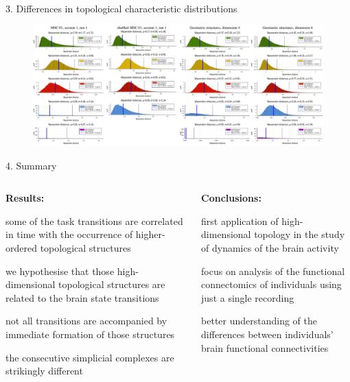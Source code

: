 \documentclass[final]{beamer}
\begin{document}
\begin{frame}{}
    \begin{block}{3. Differences in topological characteristic distributions}
    \begin{figure}[H]
        \centering
          \includegraphics[width=0.8\linewidth]{images/distributions.pdf}
        \label{fig:distros}
    \end{figure}
    \end{block}
    
    \begin{block}{4. Summary}
    \begin{columns}
            \begin{column}{0.48\textwidth}
            
                \textbf{Results:}
                \begin{itemize}
                \small{
                    \item some of the task transitions are correlated in time with the occurrence of higher-ordered topological structures
                    \item we hypothesise that those high-dimensional topological structures are related to the brain state transitions
                    \item  not all transitions are accompanied by immediate formation of those structures 
                    \item the consecutive simplicial complexes are strikingly different
                }
                \end{itemize}
            
            \end{column}    
            \begin{column}{0.48\textwidth}
                \textbf{Conclusions:}
                \begin{itemize}
                \small{
                    \item first application of high-dimensional topology in the study of dynamics of the brain activity
                    \item focus on analysis of the functional connectomics of individuals using just a single recording
                    \item better understanding of the differences between individuals’ brain functional connectivities
                }
                \end{itemize}
            

\end{column}
\end{columns}
\end{block}
\end{frame}
\end{document}
